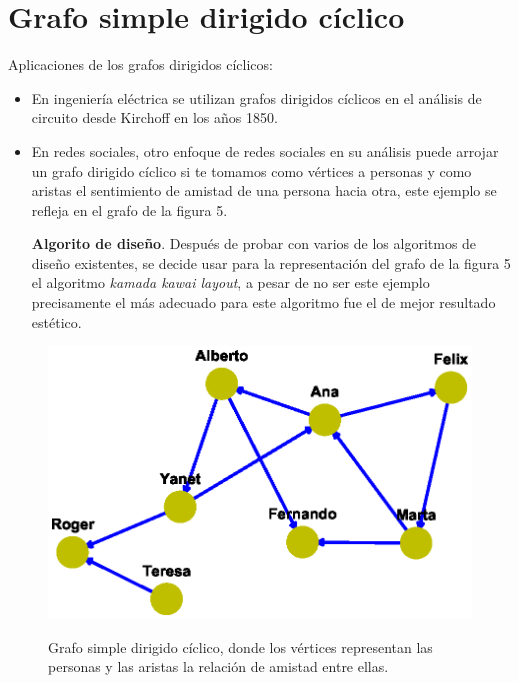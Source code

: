 \documentclass{article}
\begin{document}
\section{Grafo simple dirigido cíclico}
Aplicaciones de los grafos dirigidos cíclicos:
\begin{itemize}
\item En ingeniería eléctrica se utilizan grafos dirigidos cíclicos en el análisis de circuito desde Kirchoff en los años 1850.
\item En redes sociales, otro enfoque de redes sociales en su análisis puede arrojar un grafo dirigido cíclico si te tomamos como vértices a personas y como aristas el sentimiento de amistad de una persona hacia otra, este ejemplo se refleja en el grafo de la figura 5.\linebreak

\textbf{Algorito de diseño}.\linebreak
Después de probar con varios de los algoritmos de diseño existentes, se decide usar para la representación del grafo de la figura 5 el algoritmo \textit{kamada kawai layout}, a pesar de no ser este ejemplo precisamente el más adecuado para este algoritmo fue el de mejor resultado estético.


\end{itemize}
\begin{center}

\end{center}

\begin{figure}[h]
\begin{center}
\includegraphics[scale=0.7]{Graf5_kamada_kawai_layout.eps}\\
\caption{Grafo simple dirigido cíclico, donde los vértices representan las personas y las aristas la relación de amistad entre ellas. }
\end{center}
\end{figure}
\end{document}
